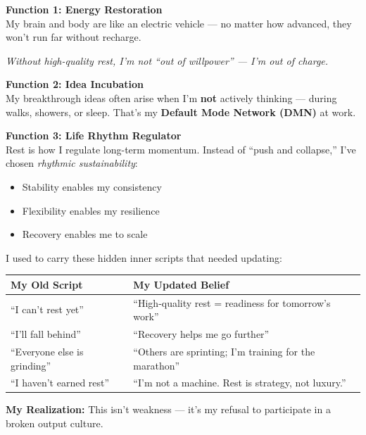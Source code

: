 \documentclass[11pt,a4paper]{article}
\begin{document}
\begin{tcolorbox}[colback=green!5,colframe=green!50,title={Three Key Functions I've Discovered in Real Rest}]
\textbf{Function 1: Energy Restoration}\\
My brain and body are like an electric vehicle — no matter how advanced, they won't run far without recharge.

\begin{center}
\textit{Without high-quality rest, I'm not ``out of willpower'' — I'm out of charge.}
\end{center}

\vspace{0.5em}
\textbf{Function 2: Idea Incubation}\\
My breakthrough ideas often arise when I'm \textbf{not} actively thinking — during walks, showers, or sleep. That's my \textbf{Default Mode Network (DMN)} at work.

\vspace{0.5em}
\textbf{Function 3: Life Rhythm Regulator}\\
Rest is how I regulate long-term momentum. Instead of ``push and collapse,'' I've chosen \textit{rhythmic sustainability}:
\begin{itemize}[leftmargin=1.5em]
    \item Stability enables my consistency
    \item Flexibility enables my resilience
    \item Recovery enables me to scale
\end{itemize}
\end{tcolorbox}

\begin{tcolorbox}[colback=red!5,colframe=red!40,title={The Dangerous Myth I Had to Overcome: ``Rest = Regression''}]
I used to carry these hidden inner scripts that needed updating:

\vspace{0.5em}
\begin{center}
\begin{tabular}{p{5.5cm}|p{6.5cm}}
\toprule
\textbf{My Old Script} & \textbf{My Updated Belief} \\
\midrule
``I can't rest yet'' & ``High-quality rest = readiness for tomorrow's work'' \\
\hline
``I'll fall behind'' & ``Recovery helps me go further'' \\
\hline
``Everyone else is grinding'' & ``Others are sprinting; I'm training for the marathon'' \\
\hline
``I haven't earned rest'' & ``I'm not a machine. Rest is strategy, not luxury.'' \\
\bottomrule
\end{tabular}
\end{center}

\vspace{0.5em}
\textbf{My Realization:} This isn't weakness — it's my refusal to participate in a broken output culture.
\end{tcolorbox}
\end{document}

